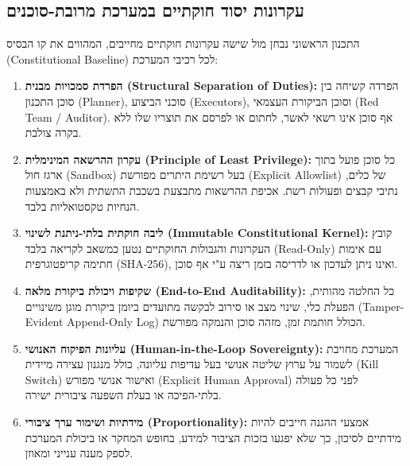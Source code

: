 \subsection{עקרונות יסוד חוקתיים במערכת מרובת-סוכנים}
התכנון הראשוני נבחן מול שישה עקרונות חוקתיים מחייבים, המהווים את קו הבסיס (\textenglish{Constitutional Baseline}) לכל רכיבי המערכת:
\begin{enumerate}
    \item \textbf{הפרדת סמכויות מבנית (\textenglish{Structural Separation of Duties}):} הפרדה קשיחה בין סוכן התכנון (\textenglish{Planner}), סוכני הביצוע (\textenglish{Executors}), וסוכן הביקורת העצמאי (\textenglish{Red Team / Auditor}). אף סוכן אינו רשאי לאשר, לחתום או לפרסם את תוצריו שלו ללא בקרה צולבת.
    \item \textbf{עקרון ההרשאה המינימלית (\textenglish{Principle of Least Privilege}):} כל סוכן פועל בתוך ארגז חול (\textenglish{Sandbox}) בעל רשימת היתרים מפורשת (\textenglish{Explicit Allowlist}) של כלים, נתיבי קבצים ופעולות רשת. אכיפת ההרשאות מתבצעת בשכבת התשתית ולא באמצעות הנחיות טקסטואליות בלבד.
    \item \textbf{ליבה חוקתית בלתי-ניתנת לשינוי (\textenglish{Immutable Constitutional Kernel}):} קובץ העקרונות והגבולות החוקתיים נטען כמשאב לקריאה בלבד (\textenglish{Read-Only}) עם אימות חתימה קריפטוגרפית (\textenglish{SHA-256}), ואינו ניתן לעדכון או לדריסה בזמן ריצה ע"י אף סוכן.
    \item \textbf{שקיפות ויכולת ביקורת מלאה (\textenglish{End-to-End Auditability}):} כל החלטה מהותית, הפעלת כלי, שינוי מצב או סירוב לבקשה מתועדים ביומן ביקורת מוגן משינויים (\textenglish{Tamper-Evident Append-Only Log}) הכולל חותמת זמן, מזהה סוכן והנמקה מפורשת.
    \item \textbf{עליונות הפיקוח האנושי (\textenglish{Human-in-the-Loop Sovereignty}):} המערכת מחויבת לשמור על ערוץ שליטה אנושי בעל עדיפות עליונה, כולל מנגנון עצירה מיידית (\textenglish{Kill Switch}) ואישור אנושי מפורש (\textenglish{Explicit Human Approval}) לפני כל פעולה בלתי-הפיכה או בעלת השפעה ציבורית ישירה.
    \item \textbf{מידתיות ושימור ערך ציבורי (\textenglish{Proportionality}):} אמצעי ההגנה חייבים להיות מידתיים לסיכון, כך שלא יפגעו בזכות הציבור למידע, בחופש המחקר או ביכולת המערכת לספק מענה ענייני ומאוזן.
\end{enumerate}

